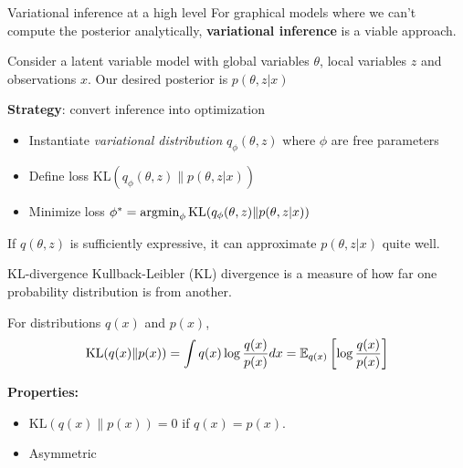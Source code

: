 \documentclass[10pt, compress]{beamer}
\begin{document}
\begin{frame}{Variational inference at a high level}
  For graphical models where we can't compute
  the posterior analytically, \textbf{variational inference}
  is a viable approach.

  \pause
    Consider a latent variable model with global variables
    $\theta$, local variables $z$ and observations $x$. Our desired
    posterior is $p(\theta, z | x)$

    \pause
    \textbf{Strategy}: convert inference into optimization
    \begin{itemize}
        \pause
      \item Instantiate \emph{variational distribution} $q_\phi(\theta, z)$
        where $\phi$ are free parameters
        \pause
      \item Define loss $\textrm{KL}(q_\phi(\theta, z)\|p(\theta, z | x))$
        \pause
      \item Minimize loss $\phi^* = \operatorname*{argmin}_\phi \textrm{KL}(q_\phi(\theta, z)\|p(\theta, z | x))$
    \end{itemize}
    \pause
    If $q(\theta, z)$ is sufficiently expressive,
    it can approximate $p(\theta, z | x)$ quite well.
\end{frame}

\begin{frame}{KL-divergence}
  Kullback-Leibler (KL) divergence
  is a measure of how far one probability distribution
  is from another.

  \pause
  For distributions $q(x)$ and $p(x)$,
  \begin{align*}
    \textrm{KL}(q(x)\|p(x)) = \int q(x)\log \frac{q(x)}{p(x)}dx = \mathbb{E}_{q(x)}\left[\log\frac{q(x)}{p(x)}\right]
  \end{align*}

  \pause
  \textbf{Properties:}
  \begin{itemize}
    \item $\textrm{KL}(q(x)\|p(x)) = 0$ if $q(x) = p(x)$.
    \item Asymmetric
  \end{itemize}

\end{frame}
\end{document}
